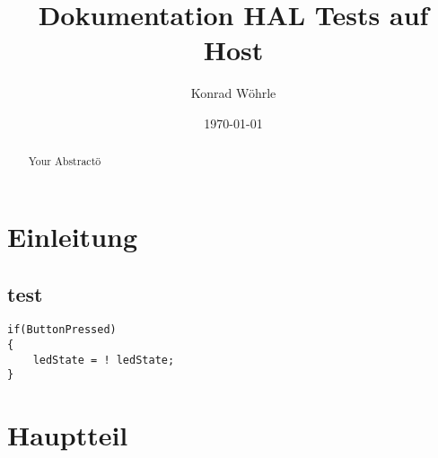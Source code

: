 \documentclass[12pt,a4paper]{article}
\title{Dokumentation HAL Tests auf Host}
\author{Konrad Wöhrle}
\date{\today}
\begin{document}
\maketitle
\tableofcontents

\section{Einleitung}

\subsection{test}

\begin{verbatim}
if(ButtonPressed)
{
    ledState = ! ledState;
}
\end{verbatim}

\section{Hauptteil}

\section{}

\begin{abstract}
Your Abstractö
\end{abstract}
\end{document}
